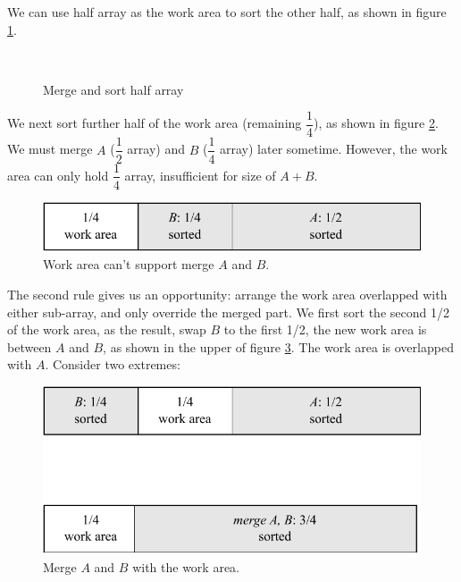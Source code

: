 \documentclass[b5paper]{article}
\begin{document}
We can use half array as the work area to sort the other half, as shown in figure \cref{fig:merge-in-place-start}.

\begin{figure}[htbp]
 \centering
       \\
 \caption{Merge and sort half array}
 \label{fig:merge-in-place-start}
\end{figure}

We next sort further half of the work area (remaining $\dfrac{1}{4}$), as shown in figure \cref{fig:merge-in-place-quater}. We must merge $A$ ($\dfrac{1}{2}$ array) and $B$ ($\dfrac{1}{4}$ array) later sometime. However, the work area can only hold $\dfrac{1}{4}$ array, insufficient for size of $A + B$.

\begin{figure}[htbp]
 \centering
 \includegraphics[scale=0.8]{img/workarea-1}
 \caption{Work area can't support merge $A$ and $B$.}
 \label{fig:merge-in-place-quater}
\end{figure}

The second rule gives us an opportunity: arrange the work area overlapped with either sub-array, and only override the merged part. We first sort the second 1/2 of the work area, as the result, swap $B$ to the first 1/2, the new work area is between $A$ and $B$, as shown in the upper of figure \cref{fig:merge-in-place-setup}. The work area is overlapped with $A$\cite{msort-in-place}. Consider two extremes:

\begin{figure}[htbp]
 \centering
 \includegraphics[scale=0.8]{img/workarea-2}
 \caption{Merge $A$ and $B$ with the work area.}
 \label{fig:merge-in-place-setup}
\end{figure}
\end{document}
